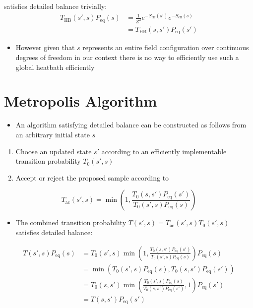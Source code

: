 satisfies detailed balance trivially:
\begin{align}
    T_{\text{HB}}(s', s)P_\text{eq}(s) &= \frac{1}{Z^2} e^{-S_\text{eff}(s')}e^{-S_\text{eff}(s)} \nonumber \\
    &=T_{\text{HB}}(s,s') P_\text{eq}(s')
\end{align}

\begin{itemize}
  \item However given that $s$ represents an entire field configuration over continuous degrees of freedom in our context there is no way to efficiently use such a global heatbath efficiently
\end{itemize}

\section{Metropolis Algorithm}
\begin{itemize}
    \item An algorithm satisfying detailed balance can be constructed as follows from an arbitrary initial state $s$
\end{itemize}
\begin{enumerate}
    \item Choose an updated state $s'$ according to an efficiently implementable transition probability $T_0(s', s)$
    \item Accept or reject the proposed sample according to
\end{enumerate}
\begin{equation}
    T_\text{ac}(s',s) = \operatorname{min}\left(1, \frac{T_0(s,s')P_\text{eq}(s')}{T_0(s',s)P_\text{eq}(s)}\right)
\end{equation}
\begin{itemize}
    \item The combined transition probability $T(s',s) = T_\text{ac}(s',s) T_0(s',s)$ satisfies detailed balance:
\end{itemize}
\begin{align}
T(s',s)P_\text{eq}(s) &= T_0(s',s) \operatorname{min}\left(1, \frac{T_0(s,s')P_\text{eq}(s')}{T_0(s',s)P_\text{eq}(s)}\right)P_\text{eq}(s) \nonumber \\
&= \operatorname{min}(T_0(s',s)P_\text{eq}(s),T_0(s,s')P_\text{eq}(s'))\nonumber \\
&= T_0(s,s')\operatorname{min}\left(\frac{T_0(s',s)P_\text{eq}(s)}{T_0(s,s')P_\text{eq}(s')},1\right)P_\text{eq}(s') \nonumber \\
&= T(s,s') P_\text{eq}(s')
\end{align}

